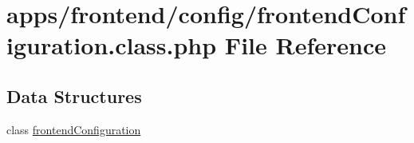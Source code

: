\hypertarget{frontend_configuration_8class_8php}{\section{apps/frontend/config/frontend\-Configuration.class.\-php File Reference}
\label{frontend_configuration_8class_8php}
}
\subsection*{Data Structures}
\begin{DoxyCompactItemize}
\item 
class \hyperlink{classfrontend_configuration}{frontend\-Configuration}
\end{DoxyCompactItemize}
